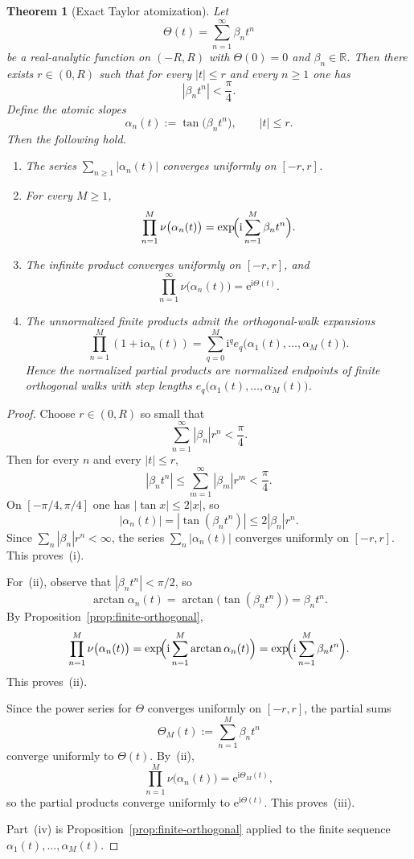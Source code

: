 \documentclass[11pt,a4paper]{article}
\numberwithin{equation}{section}
\newtheorem{theorem}{Theorem}[section]
\theoremstyle{definition}
\theoremstyle{remark}
\newcommand{\RR}{\mathbb R}
\newcommand{\e}{\mathrm e}
\newcommand{\ii}{\mathrm i}
\begin{document}
\begin{theorem}[Exact Taylor atomization]\label{thm:taylor-atomization}
Let
\[
\Theta(t)=\sum_{n=1}^{\infty}\beta_n t^n
\]
be a real-analytic function on $(-R,R)$ with $\Theta(0)=0$ and $\beta_n\in\RR$.  Then there exists $r\in(0,R)$ such that for every $|t|\le r$ and every $n\ge1$ one has
\[
|\beta_n t^n|<\frac{\pi}{4}.
\]
Define the atomic slopes
\[
\alpha_n(t):=\tan\bigl(\beta_n t^n\bigr),\qquad |t|\le r.
\]
Then the following hold.
\begin{enumerate}[label=(\roman*)]
\item The series $\sum_{n\ge1}|\alpha_n(t)|$ converges uniformly on $[-r,r]$.
\item For every $M\ge1$,
\[
\prod_{n=1}^M \nu\bigl(\alpha_n(t)\bigr)=\exp\!\Bigl(\ii\sum_{n=1}^M\beta_n t^n\Bigr).
\]
\item The infinite product converges uniformly on $[-r,r]$, and
\[
\prod_{n=1}^{\infty}\nu\bigl(\alpha_n(t)\bigr)=\e^{\ii\Theta(t)}.
\]
\item The unnormalized finite products admit the orthogonal-walk expansions
\[
\prod_{n=1}^M (1+\ii\alpha_n(t))=
\sum_{q=0}^M \ii^q e_q\bigl(\alpha_1(t),\dots,\alpha_M(t)\bigr).
\]
Hence the normalized partial products are normalized endpoints of finite orthogonal walks with step lengths $e_q\bigl(\alpha_1(t),\dots,\alpha_M(t)\bigr)$.
\end{enumerate}
\end{theorem}

\begin{proof}
Choose $r\in(0,R)$ so small that
\[
\sum_{n=1}^{\infty}|\beta_n|r^n<\frac{\pi}{4}.
\]
Then for every $n$ and every $|t|\le r$,
\[
|\beta_n t^n|\le \sum_{m=1}^{\infty}|\beta_m|r^m<\frac{\pi}{4}.
\]
On $[-\pi/4,\pi/4]$ one has $|\tan x|\le 2|x|$, so
\[
|\alpha_n(t)|=|\tan(\beta_n t^n)|\le 2|\beta_n|r^n.
\]
Since $\sum_n |\beta_n|r^n<\infty$, the series $\sum_n |\alpha_n(t)|$ converges uniformly on $[-r,r]$.  This proves~(i).

For~(ii), observe that $|\beta_n t^n|<\pi/2$, so
\[
\arctan\alpha_n(t)=\arctan\bigl(\tan(\beta_n t^n)\bigr)=\beta_n t^n.
\]
By Proposition~\ref{prop:finite-orthogonal},
\[
\prod_{n=1}^M \nu\bigl(\alpha_n(t)\bigr)
=\exp\!\Bigl(\ii\sum_{n=1}^M \arctan\alpha_n(t)\Bigr)
=\exp\!\Bigl(\ii\sum_{n=1}^M \beta_n t^n\Bigr).
\]
This proves~(ii).

Since the power series for $\Theta$ converges uniformly on $[-r,r]$, the partial sums
\[
\Theta_M(t):=\sum_{n=1}^M\beta_n t^n
\]
converge uniformly to $\Theta(t)$.  By~(ii),
\[
\prod_{n=1}^M \nu\bigl(\alpha_n(t)\bigr)=\e^{\ii\Theta_M(t)},
\]
so the partial products converge uniformly to $\e^{\ii\Theta(t)}$.  This proves~(iii).

Part~(iv) is Proposition~\ref{prop:finite-orthogonal} applied to the finite sequence $\alpha_1(t),\dots,\alpha_M(t)$.
\end{proof}
\end{document}

